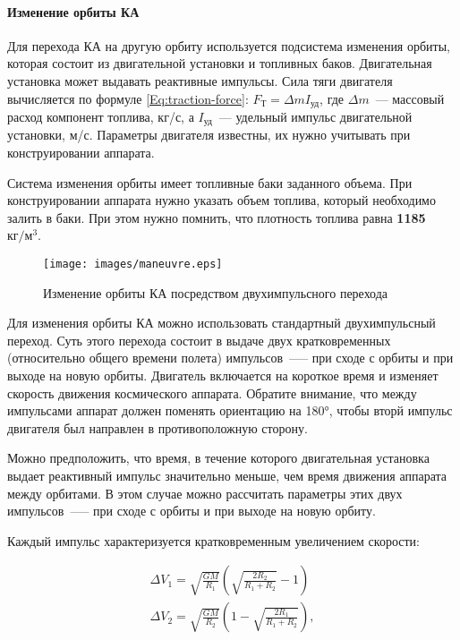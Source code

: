 \documentclass[12pt,a4paper]{article}
\begin{document}
\paragraph{Изменение орбиты КА}

Для перехода КА на другую орбиту используется подсистема изменения орбиты, которая состоит
из двигательной установки и топливных баков. Двигательная установка может выдавать
реактивные импульсы. Сила тяги двигателя вычисляется по формуле \ref{Eq:traction-force}: $
F_{\text{Т}} = \Delta m I_{\text{уд}} $, где $\Delta m$~--– массовый расход компонент
топлива, кг/с, а $I_{\text{уд}}$~--- удельный импульс двигательной установки,
м/с. Параметры двигателя известны, их нужно учитывать при конструировании аппарата.

Система изменения орбиты имеет топливные баки заданного объема. При конструировании
аппарата нужно указать объем топлива, который необходимо залить в баки. При этом нужно
помнить, что плотность топлива равна \textbf{1185 $\text{кг}/\text{м}^3$}.

\begin{figure}[tbh]
  \begin{center}
    \texttt{[image: images/maneuvre.eps]}
    \caption{Изменение орбиты КА посредством двухимпульсного перехода}
    \label{Pic:Maneuvre}
  \end{center}
\end{figure}

Для изменения орбиты КА можно использовать стандартный двухимпульсный переход. Суть этого
перехода состоит в выдаче двух кратковременных (относительно общего времени полета)
импульсов~--— при сходе с орбиты и при выходе на новую орбиты. Двигатель включается на
короткое время и изменяет скорость движения космического аппарата. Обратите внимание, что
между импульсами аппарат должен поменять ориентацию на 180°, чтобы вторй импульс двигателя
был направлен в противоположную сторону.

Можно предположить, что время, в течение которого двигательная установка выдает реактивный
импульс значительно меньше, чем время движения аппарата между орбитами. В этом случае
можно рассчитать параметры этих двух импульсов~--— при сходе с орбиты и при выходе на новую
орбиту.

Каждый импульс характеризуется кратковременным увеличением скорости:

\begin{eqnarray}
  \Delta V_1 = \sqrt{\frac{G M}{R_1}}\left(\sqrt{\frac{2 R_2}{R_1 + R_2}} - 1\right)\\
  \Delta V_2 = \sqrt{\frac{G M}{R_2}}\left(1 - \sqrt{\frac{2 R_1}{R_1 + R_2}}\right),
\end{eqnarray}
\end{document}
